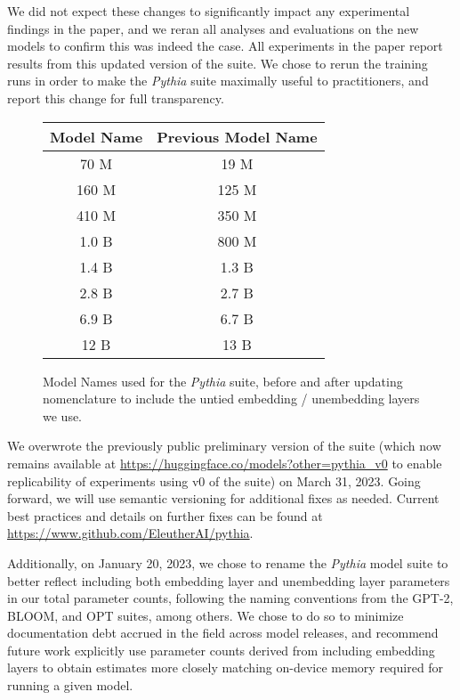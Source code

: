 \documentclass{article}
\theoremstyle{plain}
\theoremstyle{definition}
\theoremstyle{remark}
\begin{document}
We did not expect these changes to significantly impact any experimental findings in the paper, and we reran all analyses and evaluations on the new models to confirm this was indeed the case. All experiments in the paper report results from this updated version of the suite. We chose to rerun the training runs in order to make the \textit{Pythia} suite maximally useful to practitioners, and report this change for full transparency.

\begin{wrapfigure}{r}{0.5\textwidth}
    \centering
    \begin{tabular}{cc}\toprule
  Model Name & Previous Model Name\\\midrule
          70 M  & 19 M\\
         160 M  & 125 M \\
         410 M  & 350 M \\
         1.0 B  & 800 M \\
         1.4 B  & 1.3 B \\
         2.8 B  & 2.7 B \\
         6.9 B  & 6.7 B \\
         12 B  & 13 B \\
         \bottomrule
    \end{tabular}
    \caption{Model Names used for the \textit{Pythia} suite, before and after updating nomenclature to include the untied embedding / unembedding layers we use.}
	\label{table:name_change}
\end{wrapfigure}

We overwrote the previously public preliminary version of the suite (which now remains available at \url{https://huggingface.co/models?other=pythia_v0} to enable replicability of experiments using v0 of the suite) on March 31, 2023. Going forward, we will use semantic versioning for additional fixes as needed. Current best practices and details on further fixes can be found at  \url{https://www.github.com/EleutherAI/pythia}.

Additionally, on January 20, 2023, we chose to rename the \textit{Pythia} model suite to better reflect including both embedding layer and unembedding layer parameters in our total parameter counts, following the naming conventions from the GPT-2, BLOOM, and OPT suites, among others. We chose to do so to minimize documentation debt accrued in the field across model releases, and recommend future work explicitly use parameter counts derived from including embedding layers to obtain estimates more closely matching on-device memory required for running a given model. 
\end{document}

